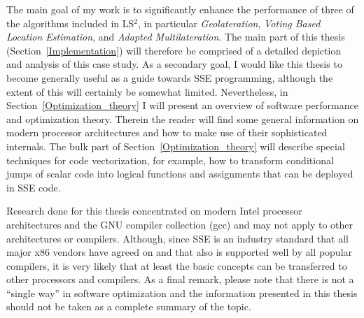 The main goal of my work is to significantly enhance the performance of three of the algorithms included in LS$^{2}$, in particular \emph{Geolateration}, \emph{Voting Based Location Estimation}, and \emph{Adapted Multilateration}. The main part of this thesis (Section~\ref{Implementation}) will therefore be comprised of a detailed depiction and analysis of this case study. As a secondary goal, I would like this thesis to become generally useful as a guide towards SSE programming, although the extent of this will certainly be somewhat limited. Nevertheless, in Section~\ref{Optimization_theory} I will present an overview of software performance and optimization theory. Therein the reader will find some general information on modern processor architectures and how to make use of their sophisticated internals. The bulk part of Section~\ref{Optimization_theory} will describe special techniques for code vectorization, for example, how to transform conditional jumps of scalar code into logical functions and assignments that can be deployed in SSE code.

Research done for this thesis concentrated on modern Intel processor architectures and the GNU compiler collection (gcc) and may not apply to other architectures or compilers. Although, since SSE is an industry standard that all major x86 vendors have agreed on and that also is supported well by all popular compilers, it is very likely that at least the basic concepts can be transferred to other processors and compilers. As a final remark, please note that there is not a ``single way'' in software optimization and the information presented in this thesis should not be taken as a complete summary of the topic.
